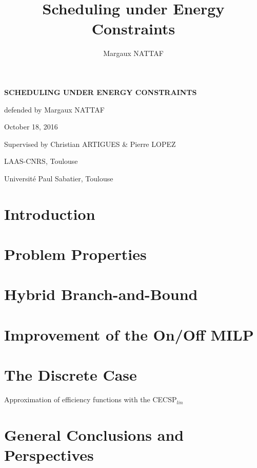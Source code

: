 \documentclass{beamer}
\title{Scheduling under Energy Constraints}
\author{Margaux NATTAF}
\institute{LAAS-CNRS Toulouse

  Université Paul Sabatier Toulouse}
\begin{document}
{\canvasspecial
  \begin{frame}
    \vspace{1.5cm}
    \begin{flushleft}
      {\Large \bf \color{bleuLAAS}SCHEDULING UNDER ENERGY CONSTRAINTS}
      
      \vspace{0.3cm}
      \small \color{bleuLAAS!90} defended by Margaux NATTAF

      October 18, 2016
    \end{flushleft}
    \vspace{0.5cm}

    {\footnotesize  \color{bleuLAAS!80}
      Supervised by Christian ARTIGUES \& Pierre LOPEZ}

    \vspace{1.5cm}
    \begin{flushright} \color{bleuLAAS!70}
      \scriptsize LAAS-CNRS, Toulouse

      Université Paul Sabatier, Toulouse
    \end{flushright}
  \end{frame}}


\setcounter{framenumber}{0}

\section{Introduction}


\section{Problem Properties}

\section{Hybrid Branch-and-Bound}


\section{Improvement of the On/Off MILP}


\section{The Discrete Case}
\begin{frame}{Approximation of efficiency functions with the CECSP$_{lin}$}
  
\end{frame}
\section{General Conclusions and Perspectives}
\end{document}
